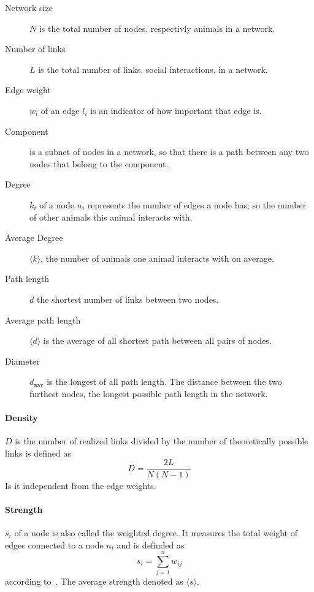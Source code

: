 \colorbox{usethiscolorhere}{
\begin{minipage}[!b]{\dimexpr\textwidth-2\fboxsep}%
\vspace{5mm}
\begin{description}
	\item[Network size] $N$ is the total number of nodes, respectivly animals in a network.
	\item[Number of links] $L$ is the total number of links, social interactions, in a network.
	\item[Edge weight] $w_i$ of an edge $l_i$ is an indicator of how important that edge is.
	\item[Component] is a subnet of nodes in a network, so that there is a path between any two nodes that belong to the component.
	\item[Degree] $k_i$ of a node $n_i$ represents the number of edges a node has; so the number of other animals this animal interacts with.	
	\item[Average Degree] $\langle k \rangle$, the number of animals one animal interacts with on average.
	\item[Path length] $d$ the shortest number of links between two nodes.
	\item[Average path length] $\langle d \rangle$ is the average of all shortest path between all pairs of nodes.
	\item[Diameter] $d_{\texttt{max}}$ is the longest of all path length. The distance between the two furthest nodes, the longest possible path length in the network.
\end{description}
\vspace{5mm}
\end{minipage}}


\paragraph{Density} $D$ is the number of realized links divided by the number
of theoretically possible links is defined as $$D=\frac{2L}{N(N-1)}$$ Is it independent from the edge weights.

\paragraph{Strength} $s_i$ of a node is also called the weighted degree. It measures the total weight of edges connected to a node $n_i$ and is definded as $$s_i = \sum_{j=1}^{n}w_{ij}$$ according to~\textcite{barrat2004architecture}. The average strength denoted as $\langle s \rangle$.

